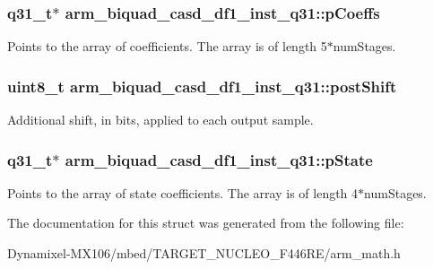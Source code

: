 \subsubsection[{\texorpdfstring{p\+Coeffs}{pCoeffs}}]{\setlength{\rightskip}{0pt plus 5cm}q31\+\_\+t$\ast$ arm\+\_\+biquad\+\_\+casd\+\_\+df1\+\_\+inst\+\_\+q31\+::p\+Coeffs}\hypertarget{structarm__biquad__casd__df1__inst__q31_aa62366c632f3b5305086f841f079dbd2}{}\label{structarm__biquad__casd__df1__inst__q31_aa62366c632f3b5305086f841f079dbd2}
Points to the array of coefficients. The array is of length 5$\ast$num\+Stages. 
\subsubsection[{\texorpdfstring{post\+Shift}{postShift}}]{\setlength{\rightskip}{0pt plus 5cm}uint8\+\_\+t arm\+\_\+biquad\+\_\+casd\+\_\+df1\+\_\+inst\+\_\+q31\+::post\+Shift}\hypertarget{structarm__biquad__casd__df1__inst__q31_a636c7fbe09ec4bef0bc0a4b4e2151cbe}{}\label{structarm__biquad__casd__df1__inst__q31_a636c7fbe09ec4bef0bc0a4b4e2151cbe}
Additional shift, in bits, applied to each output sample. 
\subsubsection[{\texorpdfstring{p\+State}{pState}}]{\setlength{\rightskip}{0pt plus 5cm}q31\+\_\+t$\ast$ arm\+\_\+biquad\+\_\+casd\+\_\+df1\+\_\+inst\+\_\+q31\+::p\+State}\hypertarget{structarm__biquad__casd__df1__inst__q31_a5dcf4727f58eb4e8e8b392508d8657bb}{}\label{structarm__biquad__casd__df1__inst__q31_a5dcf4727f58eb4e8e8b392508d8657bb}
Points to the array of state coefficients. The array is of length 4$\ast$num\+Stages. 

The documentation for this struct was generated from the following file\+:\begin{DoxyCompactItemize}
\item 
Dynamixel-\/\+M\+X106/mbed/\+T\+A\+R\+G\+E\+T\+\_\+\+N\+U\+C\+L\+E\+O\+\_\+\+F446\+R\+E/arm\+\_\+math.\+h\end{DoxyCompactItemize}
